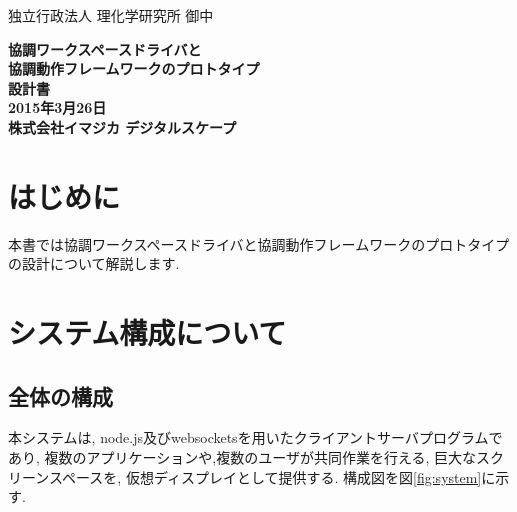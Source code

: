 \documentclass[a4paper,10pt,oneside]{jsbook}
\begin{document}
\begin{titlepage}
\noindent
独立行政法人 理化学研究所 御中
\begin{center}
	\vspace{8cm}
	{\Huge \textbf{協調ワークスペースドライバと}} \\
	\vspace{1cm}
	{\Huge \textbf{協調動作フレームワークのプロトタイプ}} \\
	\vspace{1cm}
	{\Huge \textbf{設計書}} \\
	\vspace{10cm}
	{\Large \textbf{2015年3月26日}} \\
	\vspace{0.5cm}
	{\Large \textbf{株式会社イマジカ デジタルスケープ}}
\end{center}
\end{titlepage}

\tableofcontents

\chapter{はじめに}
本書では協調ワークスペースドライバと協調動作フレームワークのプロトタイプの設計について解説します.

\chapter{システム構成について}
\section{全体の構成}
本システムは, node.js及びwebsocketsを用いたクライアントサーバプログラムであり, 複数のアプリケーションや,複数のユーザが共同作業を行える, 巨大なスクリーンスペースを, 仮想ディスプレイとして提供する. 構成図を図\ref{fig:system}に示す.
\end{document}
